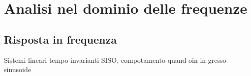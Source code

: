 \part{Analisi nel dominio delle frequenze}

\chapter{Risposta in frequenza}
Sistemi lineari tempo invarianti SISO, compotamento quand oin in gresso sinusoide